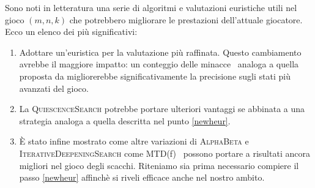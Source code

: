 \documentclass{article}
\begin{document}
Sono noti in letteratura una serie di algoritmi e valutazioni euristiche utili
nel gioco $(m, n, k)$ che potrebbero migliorare le prestazioni dell'attuale
giocatore. Ecco un elenco dei pi\`u significativi:
\begin{enumerate}
  \item Adottare un'euristica per la valutazione pi\`u raffinata. Questo cambiamento
    avrebbe il maggiore impatto: un conteggio delle minacce~\cite{heur}
    analoga a quella proposta da \citeauthor{heur} migliorerebbe significativamente
    la precisione sugli stati pi\`u avanzati del gioco. \label{newheur}
  \item La \textsc{QuiescenceSearch} potrebbe portare ulteriori vantaggi se
    abbinata a una strategia analoga a quella descritta nel punto \vref{newheur}.
  \item \`E stato infine mostrato come altre variazioni di \textsc{AlphaBeta} e
    \textsc{IterativeDeepeningSearch} come MTD(f)~\cite{mtdf} possono portare a
    risultati ancora migliori nel gioco degli scacchi. Riteniamo sia prima
    necessario compiere il passo \vref{newheur} affinch\`e si riveli efficace anche nel nostro ambito.
\end{enumerate}



\end{document}
